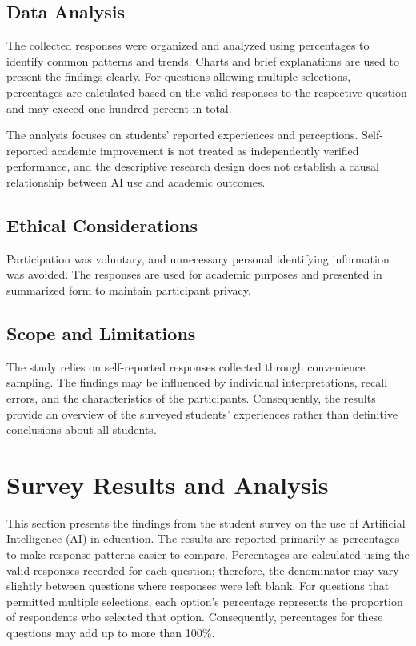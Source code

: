 \documentclass[12pt,a4paper]{article}
\begin{document}
\subsection{Data Analysis}

The collected responses were organized and analyzed using percentages to identify common patterns and trends. Charts and brief explanations are used to present the findings clearly. For questions allowing multiple selections, percentages are calculated based on the valid responses to the respective question and may exceed one hundred percent in total.

The analysis focuses on students' reported experiences and perceptions. Self-reported academic improvement is not treated as independently verified performance, and the descriptive research design does not establish a causal relationship between AI use and academic outcomes.

\subsection{Ethical Considerations}

Participation was voluntary, and unnecessary personal identifying information was avoided. The responses are used for academic purposes and presented in summarized form to maintain participant privacy.

\subsection{Scope and Limitations}

The study relies on self-reported responses collected through convenience sampling. The findings may be influenced by individual interpretations, recall errors, and the characteristics of the participants. Consequently, the results provide an overview of the surveyed students' experiences rather than definitive conclusions about all students.


\section{Survey Results and Analysis}
\label{sec:survey-results}

This section presents the findings from the student survey on the use of Artificial Intelligence (AI) in education. The results are reported primarily as percentages to make response patterns easier to compare. Percentages are calculated using the valid responses recorded for each question; therefore, the denominator may vary slightly between questions where responses were left blank. For questions that permitted multiple selections, each option's percentage represents the proportion of respondents who selected that option. Consequently, percentages for these questions may add up to more than 100\%.
\end{document}
